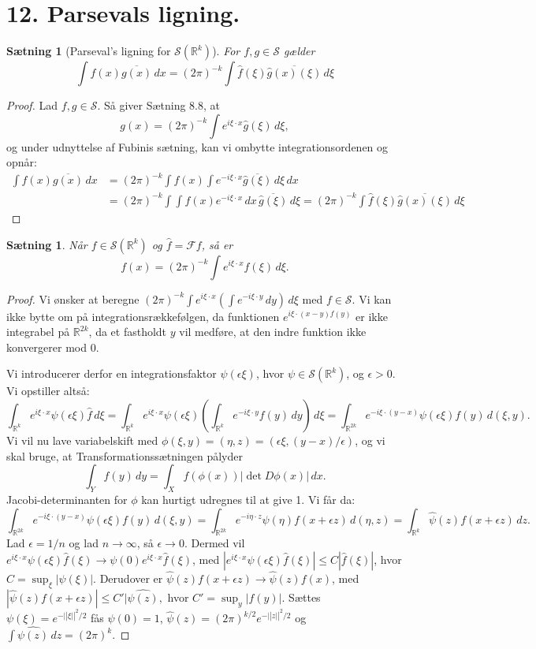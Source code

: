 \documentclass[12pt]{report}
\newtheorem{theorem}[lemma]{Sætning}
\theoremstyle{break}
\newtheorem*{proof}{Bevis}
\theoremstyle{break}
\newcommand{\RR}{\mathbb{R}}
\newcommand{\FS}{\mathcal{S}}
\newcommand{\FI}{\mathcal{F}}
\newcommand{\laengde}[1]{\lvert|#1\rvert|}
\newcommand{\1}{\mathds{1}}
\begin{document}
\newpage
\section*{12. Parsevals ligning.}
\begin{theorem}[Parseval's ligning for $\FS(\RR^k)$]
For $f,g\in\FS$ gælder
\[\int f(x)\overline{g(x)}\,dx = (2\pi)^{-k}\int\hat{f}(\xi)\overline{\hat{g}(x)(\xi)}\,d\xi\]
\end{theorem}
\begin{proof}
Lad $f,g\in\FS$. Så giver Sætning 8.8, at
\[g(x)=(2\pi)^{-k}\int e^{i\xi\cdot x}\hat{g}(\xi)\,d\xi,\] og under udnyttelse af Fubinis sætning, kan vi ombytte integrationsordenen og opnår:
\begin{align*}
\int f(x)\overline{g(x)}\,dx & =(2\pi)^{-k}\int f(x)\int e^{-i\xi\cdot x}\overline{\hat{g}(\xi)}\,d\xi\,dx\\& = (2\pi)^{-k}\int\int f(x) e^{-i\xi\cdot x}\,dx\,\overline{\hat{g}(\xi)}\,d\xi = (2\pi)^{-k}\int\hat{f}(\xi)\overline{\hat{g}(x)(\xi)}\,d\xi
\end{align*}
\end{proof}
\begin{theorem}
Når $f\in\FS(\RR^k)$ og $\hat{f}=\FI f$, så er
\[f(x)=(2\pi)^{-k}\int e^{i\xi\cdot x}\hat{f}(\xi)\,d\xi.\]
\end{theorem}
\begin{proof}
Vi ønsker at beregne $(2\pi)^{-k}\int e^{i\xi\cdot x}(\int e^{-i\xi\cdot y}\,dy)\,d\xi$ med $f\in\FS$. Vi kan ikke bytte om på integrationsrækkefølgen, da funktionen $e^{i\xi\cdot(x-y)f(y)}$ er ikke integrabel på $\RR^{2k}$, da et fastholdt $y$ vil medføre, at den indre funktion ikke konvergerer mod $0$.

\bigskip

Vi introducerer derfor en integrationsfaktor $\psi(\epsilon\xi)$, hvor $\psi\in\FS(\RR^k)$, og $\epsilon>0$.
Vi opstiller altså:
\[\int_{\RR^k}e^{i\xi\cdot x}\psi(\epsilon\xi)\hat{f}\,d\xi = \int_{\RR^k}e^{i\xi\cdot x}\psi(\epsilon\xi)\left(\int_{\RR^k}e^{-i\xi\cdot y}f(y)\,dy\right)\,d\xi=\int_{\RR^{2k}}e^{-i\xi\cdot (y-x)}\psi(\epsilon\xi)f(y)\,d(\xi,y).\]
Vi vil nu lave variabelskift med $\phi(\xi,y)=(\eta,z)=(\epsilon\xi,(y-x)/\epsilon)$, og vi skal bruge, at Transformationssætningen pålyder
\[\int_Yf(y)\,dy =\int_X f(\phi(x))|\det D\phi(x)|\,dx.\]
Jacobi-determinanten for $\phi$ kan hurtigt udregnes til at give 1. Vi får da:
\[\int_{\RR^{2k}}e^{-i\xi\cdot (y-x)}\psi(\epsilon\xi)f(y)\,d(\xi,y) = \int_{\RR^{2k}}e^{-i\eta\cdot z}\psi(\eta)f(x+\epsilon z)\,d(\eta,z) = \int_{\RR^k}\hat{\psi}(z)f(x+\epsilon z)\,dz.\]
Lad $\epsilon=1/n$ og lad  $n\to\infty$, så $\epsilon\to 0$. Dermed vil $e^{i\xi\cdot x}\psi(\epsilon\xi)\hat{f}(\xi)\to\psi(0)e^{i\xi\cdot x}\hat{f}(\xi)$, med $|e^{i\xi\cdot x}\psi(\epsilon\xi)\hat{f}(\xi)|\leq C|\hat{f}(\xi)|$, hvor $C=\sup_\xi|\psi(\xi)|$. Derudover er $\hat{\psi}(z)f(x+\epsilon z)\to\hat{\psi}(z)f(x)$, med $|\hat{\psi}(z)f(x+\epsilon z)|\leq C'|\hat{\psi(z)},$ hvor $C'=\sup_y|f(y)|$. Sættes $\psi(\xi)=e^{-\laengde{\xi}^2/2}$ fås $\psi(0)=1$, $\hat{\psi}(z)=(2\pi)^{k/2}e^{-\laengde{z}^2/2}$ og $\int\hat{\psi(z)}\,dz=(2\pi)^k.$
\end{proof}
\end{document}
